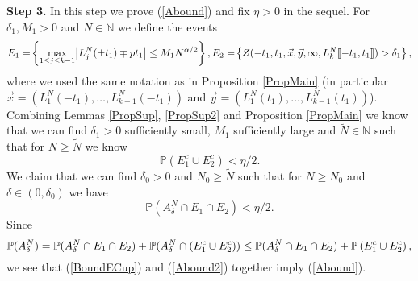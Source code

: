 {\bf \raggedleft Step 3.} In this step we prove (\ref{Abound}) and fix $\eta > 0$ in the sequel. For $\delta_1, M_1 > 0$ and $N \in \mathbb{N}$ we define the events
\begin{equation}
\begin{split}
E_1= \hspace{-0.5mm}\left\{\max_{1\leq j \leq k-1}\abs*{L_j^N(\pm t_1) \mp pt_1}\leq M_1N^{\alpha/2} \right\}, E_2=\hspace{-0.5mm}\left\{Z(-t_1, t_1, \vec x, \vec y, \infty, L_{k}^N\llbracket -t_1, t_1 \rrbracket)>\delta_1\right\},
\end{split}
\end{equation}
where we used the same notation as in Proposition \ref{PropMain} (in particular $\vec x = (L^N_1(-t_1), \dots, L_{k-1}^N(-t_1))$ and $\vec y = (L_1^N(t_1), \dots, L_{k-1}^N(t_1))$). Combining Lemmas \ref{PropSup}, \ref{PropSup2} and Proposition \ref{PropMain} we know that we can find $\delta_1 > 0$ sufficiently small, $M_1$ sufficiently large and $\tilde{N} \in \mathbb{N}$ such that for $N \geq \tilde{N}$ we know
\begin{equation}\label{BoundECup}
\mathbb{P} \left(E_1^c \cup E_2^c \right) < \eta/2.
\end{equation}
We claim that we can find $\delta_0 > 0$ and $N_0 \geq \tilde{N}$ such that for $N \geq N_0$ and $\delta \in (0, \delta_0)$ we have
\begin{equation}\label{Abound2}
\mathbb{P}(A^N_\delta \cap E_1 \cap E_2 ) < \eta/2.
\end{equation}
Since
$$\mathbb{P}(A^N_\delta)= \mathbb{P}(A^N_\delta\cap E_1\cap E_2)+\mathbb{P}(A^N_\delta\cap\left(E_1^c\cup E_2^c\right))\leq \mathbb{P}(A^N_\delta\cap E_1\cap E_2)+\mathbb{P} \left(E_1^c \cup E_2^c \right),$$
we see that (\ref{BoundECup}) and (\ref{Abound2}) together imply (\ref{Abound}).\\

